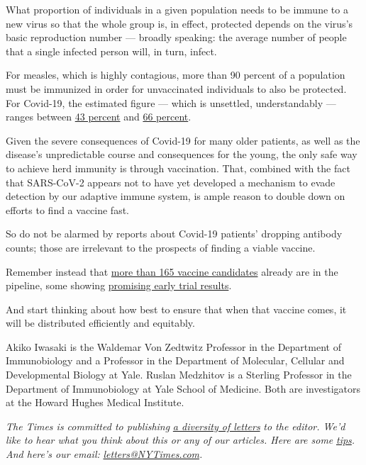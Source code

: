 What proportion of individuals in a given population needs to be immune
to a new virus so that the whole group is, in effect, protected depends
on the virus's basic reproduction number --- broadly speaking: the
average number of people that a single infected person will, in turn,
infect.

For measles, which is highly contagious, more than 90 percent of a
population must be immunized in order for unvaccinated individuals to
also be protected. For Covid-19, the estimated figure --- which is
unsettled, understandably --- ranges between
\href{https://science.sciencemag.org/content/early/2020/06/22/science.abc6810}{43
percent} and
\href{https://science.sciencemag.org/content/369/6500/208?ijkey=805a30207015dd1c16dd7b169019e0de4f8b8fc4\&keytype2=tf_ipsecsha}{66
percent}.

Given the severe consequences of Covid-19 for many older patients, as
well as the disease's unpredictable course and consequences for the
young, the only safe way to achieve herd immunity is through
vaccination. That, combined with the fact that SARS-CoV-2 appears not to
have yet developed a mechanism to evade detection by our adaptive immune
system, is ample reason to double down on efforts to find a vaccine
fast.

So do not be alarmed by reports about Covid-19 patients' dropping
antibody counts; those are irrelevant to the prospects of finding a
viable vaccine.

Remember instead that
\href{https://www.nytimes3xbfgragh.onion/interactive/2020/science/coronavirus-vaccine-tracker.html}{more
than 165 vaccine candidates} already are in the pipeline, some showing
\href{https://www.nytimes3xbfgragh.onion/2020/07/20/world/covid-coronavirus-vaccine.html}{promising
early trial results}.

And start thinking about how best to ensure that when that vaccine
comes, it will be distributed efficiently and equitably.

Akiko Iwasaki is the Waldemar Von Zedtwitz Professor in the Department
of Immunobiology and a Professor in the Department of Molecular,
Cellular and Developmental Biology at Yale. Ruslan Medzhitov is a
Sterling Professor in the Department of Immunobiology at Yale School of
Medicine. Both are investigators at the Howard Hughes Medical Institute.

\emph{The Times is committed to publishing}
\href{https://www.nytimes3xbfgragh.onion/2019/01/31/opinion/letters/letters-to-editor-new-york-times-women.html}{\emph{a
diversity of letters}} \emph{to the editor. We'd like to hear what you
think about this or any of our articles. Here are some}
\href{https://help.nytimes3xbfgragh.onion/hc/en-us/articles/115014925288-How-to-submit-a-letter-to-the-editor}{\emph{tips}}\emph{.
And here's our email:}
\href{mailto:letters@NYTimes.com}{\emph{letters@NYTimes.com}}\emph{.}

